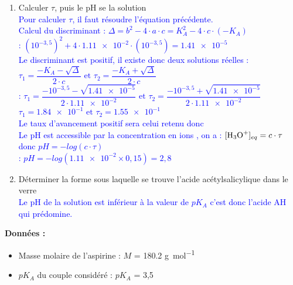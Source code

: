 \documentclass[a4paper,12pt]{article}
\begin{document}
\begin{enumerate}
\begin{enumerate}
		\textcolor{blue}{À partir des expressions précédentes, la constante d'équilibre peut s'écrire : $K_A = \dfrac{(c \cdot \tau)^2}{c(1-\tau)}$\\
		En transformant l'expression elle devient : $K_A \cdot c \cdot (1-\tau)=c^2\cdot\tau^2$\\
		En simplifiant et en distribuant elle devient : $K_A -K_A\cdot \tau = c\cdot \tau^2$\\
		Enfin en ramenant du même coté, l'équation suivante est obtenue : }
		\item Calculer $\tau$, puis le pH se la solution\\
		\textcolor{blue}{Pour calculer $\tau$, il faut résoudre l'équation précédente.\\
		Calcul du discriminant : $\Delta = b^2 - 4 \cdot a \cdot c = K_A^2 - 4 \cdot c \cdot (-K_A)$ \\
		 : $(10^{-3,5})^2 + 4 \cdot \num{1,11e-2} \cdot (10^{-3,5}) = \num{1,41e-5}$\\
		Le discriminant est positif, il existe donc deux solutions réelles : $\tau_1 = \dfrac{-K_A-\sqrt{\Delta}}{2\cdot c} \text{ et } \tau_2 = \dfrac{-K_A+\sqrt{\Delta}}{2\cdot c}$\\
		 : $\tau_1 = \dfrac{-10^{-3,5}-\sqrt{\num{1,41e-5}}}{2\cdot \num{1,11e-2}} \text{ et } \tau_2 = \dfrac{-10^{-3,5}+\sqrt{\num{1,41e-5}}}{2\cdot \num{1,11e-2}}$\\
		$\tau_1 = \num{1,84e-1} \text{ et } \tau_2 = \num{1,55e-1}$\\
		Le taux d'avancement positif sera celui retenu donc \\
		Le pH est accessible par la concentration en ions , on a : $[\ce{H3O+}]_{eq}=c\cdot\tau$ donc $pH = -log(c\cdot\tau)$ \\
		 : $pH = -log(\num{1,11e-2} \times 0,15)=2,8$}
		\item Déterminer la forme sous laquelle se trouve l'acide acétylsalicylique dans le verre\\
		\textcolor{blue}{Le pH de la solution est inférieur à la valeur de $pK_A$ c'est donc l'acide AH qui prédomine.}
	\end{enumerate}
\end{enumerate}
\textbf{Données :}
\begin{itemize}
	\item Masse molaire de l'aspirine : $M$ = \num{180,2} \unit{\gram \per \mole}
	\item $pK_A$ du couple considéré : $pK_A$ = 3,5 
\end{itemize}
\end{document}
